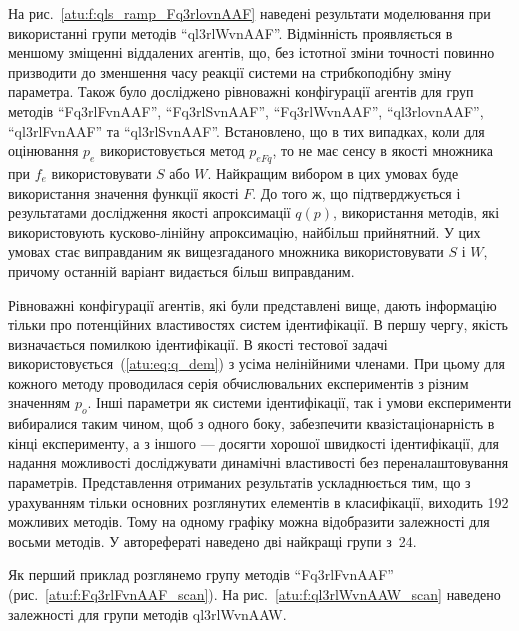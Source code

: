 \documentclass[a4paper,13pt]{atuaref}
\begin{document}
На рис.~\ref{atu:f:qls_ramp_Fq3rlovnAAF} наведені результати моделювання при використанні групи методів
``ql3rlWvnAAF''.
Відмінність проявляється в меншому зміщенні віддалених агентів, що, без
істотної зміни точності повинно призводити до зменшення часу реакції системи на
стрибкоподібну зміну параметра.
Також було досліджено рівноважні конфігурації агентів для
груп методів
``Fq3rlFvnAAF'',
``Fq3rlSvnAAF'',
``Fq3rlWvnAAF'',
``ql3rlovnAAF'',
``ql3rlFvnAAF'' та
``ql3rlSvnAAF''.
Встановлено, що в тих випадках, коли для оцінювання $ p_e $ використовується
метод $ p_{eFq} $, то не має сенсу в якості множника при $ f_e $
використовувати $ S $ або $ W $. Найкращим вибором в цих умовах буде
використання значення функції якості $ F $. До того ж, що підтверджується і
результатами дослідження якості апроксимації $ q (p) $, використання методів,
які використовують кусково-лінійну апроксимацію, найбільш прийнятний. У цих
умовах стає виправданим як вищезгаданого множника використовувати
$ S $ і $ W$, причому останній варіант видається більш виправданим.


Рівноважні конфігурації агентів, які були представлені вище, дають інформацію тільки про
потенційних властивостях систем ідентифікації. В першу чергу, якість визначається
помилкою ідентифікації. В якості тестової задачі
використовується~(\ref{atu:eq:q_dem}) з усіма нелінійними членами. При цьому для кожного методу
проводилася серія обчислювальних експериментів з різним значенням $ p_o $. Інші
параметри як системи ідентифікації, так і умови експерименти вибиралися таким
чином, щоб з одного боку, забезпечити квазістаціонарність в кінці експерименту, а
з іншого --- досягти хорошої швидкості ідентифікації, для надання можливості
досліджувати динамічні властивості без переналаштовування параметрів.
Представлення отриманих результатів ускладнюється тим, що з урахуванням тільки
основних розглянутих елементів в класифікації, виходить 192 можливих методів.
Тому на одному графіку можна відобразити залежності для восьми методів.
У авторефераті наведено дві найкращі групи з~24.

Як перший приклад розглянемо групу методів
``Fq3rlFvnAAF'' (рис.~\ref{atu:f:Fq3rlFvnAAF_scan}).
На рис.~\ref{atu:f:ql3rlWvnAAW_scan} наведено залежності для групи методів ql3rlWvnAAW.
\end{document}
